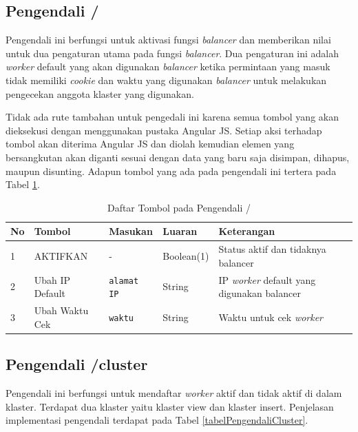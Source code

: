 \documentclass{ta-its}
\begin{document}
			\subsection{Pengendali /}
				Pengendali ini berfungsi untuk aktivasi fungsi \textit{balancer} dan memberikan nilai untuk dua pengaturan utama pada fungsi \textit{balancer}. Dua pengaturan ini adalah \textit{worker} default yang akan digunakan \textit{balancer} ketika permintaan yang masuk tidak memiliki \textit{cookie} dan waktu yang digunakan \textit{balancer} untuk melakukan pengecekan anggota klaster yang digunakan.
				
				Tidak ada rute tambahan untuk pengedali ini karena semua tombol yang akan dieksekusi dengan menggunakan pustaka Angular JS. Setiap aksi terhadap tombol akan diterima Angular JS dan diolah kemudian elemen yang bersangkutan akan diganti sesuai dengan data yang baru saja disimpan, dihapus, maupun disunting. Adapun tombol yang ada pada pengendali ini tertera pada Tabel \ref{tabelPengendaliHome}.
				
				\begin{longtable}{|p{}|p{0.2\textwidth}|p{}|p{}|p{}|} %
					
					\caption{Daftar Tombol pada Pengendali /} \label{tabelPengendaliHome} \\
					\hline
					\textbf{No} & \textbf{Tombol} & \textbf{Masukan} & \textbf{Luaran} & \textbf{Keterangan} \\ \hline
					
					\endhead
					\endfoot
					\endlastfoot
					
					1 & AKTIFKAN & - & Boolean(1) & Status aktif dan tidaknya balancer\\ \hline
					2 & Ubah IP Default & \texttt{alamat IP} & String & IP \textit{worker} default yang digunakan balancer \\ \hline
					3 & Ubah Waktu Cek & \texttt{waktu} & String & Waktu untuk cek \textit{worker} \\ \hline
					
				\end{longtable}
			
			\subsection{Pengendali /cluster}
				Pengendali ini berfungsi untuk mendaftar \textit{worker} aktif dan tidak aktif di dalam klaster. Terdapat dua klaster yaitu klaster view dan klaster insert. Penjelasan implementasi pengendali terdapat pada Tabel \ref{tabelPengendaliCluster}.
				
\end{document}
